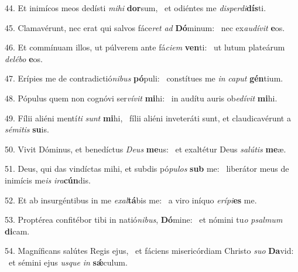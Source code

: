 44. Et inimícos meos dedísti \textit{mi}\textit{hi} \textbf{dor}sum, \ast\  et odiéntes me \textit{dis}\textit{per}\textit{di}\textbf{dís}ti.\

45. Clamavérunt, nec erat qui salvos fáce\textit{ret} \textit{ad} \textbf{Dó}minum: \ast\  nec ex\textit{au}\textit{dí}\textit{vit} \textbf{e}os.\

46. Et commínuam illos, ut púlverem ante fá\textit{ci}\textit{em} \textbf{ven}ti: \ast\  ut lutum plateárum \textit{de}\textit{lé}\textit{bo} \textbf{e}os.\

47. Erípies me de contradictió\textit{ni}\textit{bus} \textbf{pó}puli: \ast\  constítues me \textit{in} \textit{ca}\textit{put} \textbf{gén}tium.\

48. Pópulus quem non cognóvi ser\textit{ví}\textit{vit} \textbf{mi}hi: \ast\  in audítu auris ob\textit{e}\textit{dí}\textit{vit} \textbf{mi}hi.\

49. Fílii aliéni mentí\textit{ti} \textit{sunt} \textbf{mi}hi, \ast\  fílii aliéni inveteráti sunt, et claudicavérunt a \textit{sé}\textit{mi}\textit{tis} \textbf{su}is.\

50. Vivit Dóminus, et benedíctus \textit{De}\textit{us} \textbf{me}us: \ast\  et exaltétur Deus \textit{sa}\textit{lú}\textit{tis} \textbf{me}æ.\

51. Deus, qui das vindíctas mihi, et subdis pó\textit{pu}\textit{los} \textbf{sub} me: \ast\  liberátor meus de inimícis me\textit{is} \textit{i}\textit{ra}\textbf{cún}dis.\

52. Et ab insurgéntibus in me \textit{ex}\textit{al}\textbf{tá}bis me: \ast\  a viro iníquo \textit{e}\textit{rí}\textit{pi}\textbf{es} me.\

53. Proptérea confitébor tibi in natió\textit{ni}\textit{bus}, \textbf{Dó}mine: \ast\  et nómini tu\textit{o} \textit{psal}\textit{mum} \textbf{di}cam.\

54. Magníficans salútes Regis ejus, \dag\  et fáciens misericórdiam Christo \textit{su}\textit{o} \textbf{Da}vid: \ast\  et sémini ejus \textit{us}\textit{que} \textit{in} \textbf{sǽ}culum.\

